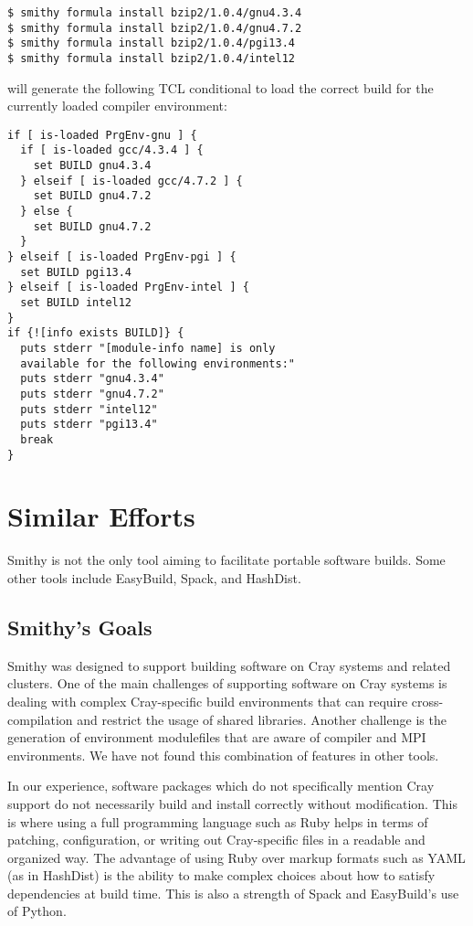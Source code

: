 \documentclass{acm_proc_article-sp}
\begin{document}
\begin{quoting}[leftmargin=0pt]
\begin{verbatim}
$ smithy formula install bzip2/1.0.4/gnu4.3.4
$ smithy formula install bzip2/1.0.4/gnu4.7.2
$ smithy formula install bzip2/1.0.4/pgi13.4
$ smithy formula install bzip2/1.0.4/intel12
\end{verbatim}
\end{quoting}

will generate the following TCL conditional to load the correct build for the
currently loaded compiler environment:

\begin{quoting}[leftmargin=0pt]
\begin{verbatim}
if [ is-loaded PrgEnv-gnu ] {
  if [ is-loaded gcc/4.3.4 ] {
    set BUILD gnu4.3.4
  } elseif [ is-loaded gcc/4.7.2 ] {
    set BUILD gnu4.7.2
  } else {
    set BUILD gnu4.7.2
  }
} elseif [ is-loaded PrgEnv-pgi ] {
  set BUILD pgi13.4
} elseif [ is-loaded PrgEnv-intel ] {
  set BUILD intel12
}
if {![info exists BUILD]} {
  puts stderr "[module-info name] is only
  available for the following environments:"
  puts stderr "gnu4.3.4"
  puts stderr "gnu4.7.2"
  puts stderr "intel12"
  puts stderr "pgi13.4"
  break
}
\end{verbatim}
\end{quoting}

\section{Similar Efforts}

Smithy is not the only tool aiming to facilitate portable software builds. Some
other tools include EasyBuild\cite{EasyBuild}, Spack\cite{spack}, and
HashDist\cite{hashdist}.

\subsection{Smithy's Goals}

Smithy was designed to support building software on Cray systems and related
clusters. One of the main challenges of supporting software on Cray systems is
dealing with complex Cray-specific build environments that can require
cross-compilation and restrict the usage of shared libraries. Another challenge
is the generation of environment modulefiles that are aware of compiler and MPI
environments. We have not found this combination of features in other tools.

In our experience, software packages which do not specifically mention Cray
support do not necessarily build and install correctly without
modification. This is where using a full programming language such as Ruby helps
in terms of patching, configuration, or writing out Cray-specific files in a
readable and organized way. The advantage of using Ruby over markup formats such
as YAML (as in HashDist) is the ability to make complex choices about how to
satisfy dependencies at build time. This is also a strength of Spack and
EasyBuild's use of Python.
\end{document}
